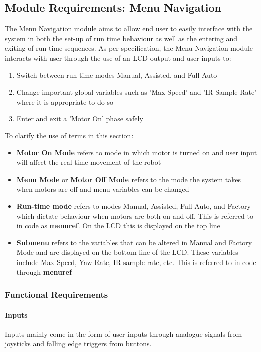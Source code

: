 \documentclass{article}
\begin{document}
	
	\subsection{Module Requirements: Menu Navigation}
		The Menu Navigation module aims to allow end user to easily interface with the system in both the set-up of run time behaviour as well as the entering and exiting of run time sequences. As per specification, the Menu Navigation module interacts with user through the use of an LCD output and user inputs to:
	\begin{enumerate}
		\item Switch between run-time modes Manual, Assisted, and Full Auto
		\item Change important global variables such as 'Max Speed' and 'IR Sample Rate' where it is appropriate to do so
		\item Enter and exit a 'Motor On' phase safely
	\end{enumerate}
	To clarify the use of terms in this section:
	\begin{itemize}
		\item \textbf{Motor On Mode} refers to mode in which motor is turned on and user input will affect the real time movement of the robot
		\item \textbf{Menu Mode} or \textbf{Motor Off Mode} refers to the mode the system takes when motors are off and menu variables can be changed
		\item \textbf{Run-time mode} refers to modes Manual, Assisted, Full Auto, and Factory which dictate behaviour when motors are both on and off. This is referred to in code as \textbf{menu\textunderscore ref}. On the LCD this is displayed on the top line
		\item \textbf{Submenu} refers to the variables that can be altered in Manual and Factory Mode and are displayed on the bottom line of the LCD. These variables include Max Speed, Yaw Rate, IR sample rate, etc. This is referred to in code through \textbf{menu\textunderscore ref}
	\end{itemize}
	
	
	\subsubsection{Functional Requirements}
	\paragraph{Inputs}
	Inputs mainly come in the form of user inputs through analogue signals from joysticks and falling edge triggers from buttons.\\
	 
\end{document}

